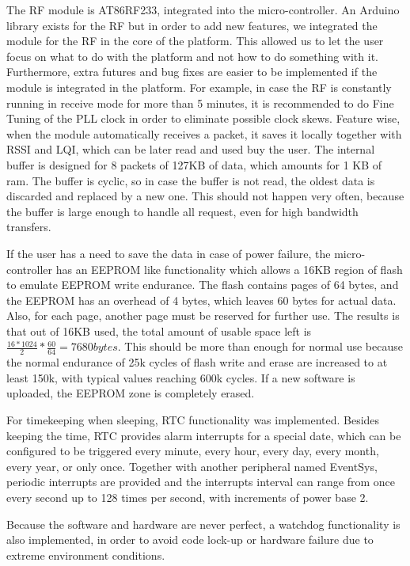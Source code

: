 The RF module is AT86RF233, integrated into the micro-controller. An Arduino library
\cite{rf233}
exists for the RF but in order to add new features, we integrated the module for the RF in the core
of the platform. This allowed us to let the user focus on what to do with the platform and not how to do
something with it. Furthermore, extra futures and bug fixes are easier to be implemented if the module is
integrated in the platform. For example, in case the RF is constantly running in receive mode for
more than 5 minutes, it is recommended to do Fine Tuning of the PLL clock in order to eliminate
possible clock skews. Feature wise, when the module automatically receives a packet, it saves it
locally together with RSSI and LQI, which can be later read and used buy the user. The internal
buffer is designed for 8 packets of 127KB of data, which amounts for 1 KB of ram. The buffer is
cyclic, so in case the buffer is not read, the oldest data is discarded and replaced by a new one.
This should not happen very often, because the buffer is large enough to handle all request, even
for high bandwidth transfers.

If the user has a need to save the data in case of power failure, the micro-controller has an
EEPROM like functionality which allows a 16KB region of flash to emulate EEPROM write endurance.
The flash contains pages of 64 bytes, and the EEPROM has an overhead of 4 bytes, which leaves 60
bytes for actual data. Also, for each page, another page must be reserved for further use.
The results is that out of 16KB used, the total amount of usable space left is $\frac{16*1024}{2}
* \frac{60}{64} = 7680 bytes$. This should be more than enough for normal use because the normal
endurance of 25k cycles of flash write and erase are increased to at least 150k, with typical
values reaching 600k cycles. If a new software is uploaded, the EEPROM zone is completely erased.

For timekeeping when sleeping, RTC functionality was implemented. Besides keeping the time, RTC
provides alarm interrupts for a special date, which can be configured to be triggered every
minute, every hour, every day, every month, every year, or only once. Together with another
peripheral named EventSys, periodic interrupts are provided and the interrupts interval can range
from once every second up to 128 times per second, with increments of power base 2.

Because the software and hardware are never perfect, a watchdog functionality is also implemented,
in order to avoid code lock-up or hardware failure due to extreme environment conditions.


